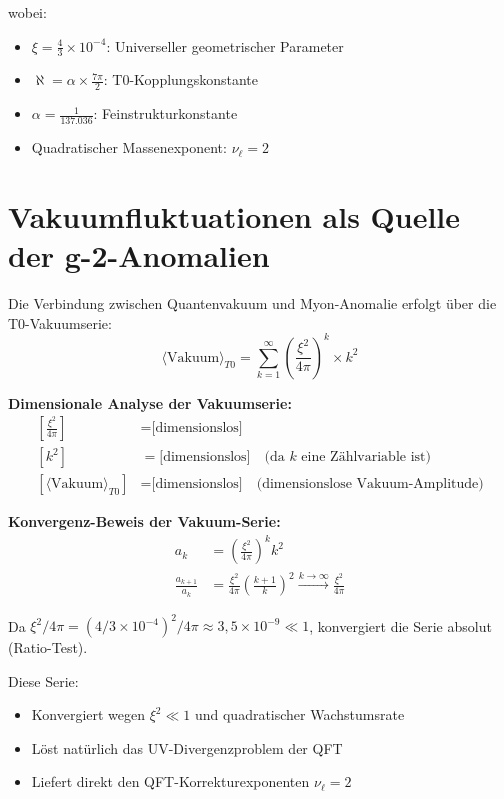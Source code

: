 \documentclass[12pt,a4paper]{article}
\begin{document}
	wobei:
	\begin{itemize}
		\item $\xi = \frac{4}{3} \times 10^{-4}$: Universeller geometrischer Parameter
		\item $\aleph = \alpha \times \frac{7\pi}{2}$: T0-Kopplungskonstante  
		\item $\alpha = \frac{1}{137.036}$: Feinstrukturkonstante
		\item Quadratischer Massenexponent: $\nu_\ell = 2$
	\end{itemize}
	
	\section{Vakuumfluktuationen als Quelle der g-2-Anomalien}
	
	Die Verbindung zwischen Quantenvakuum und Myon-Anomalie erfolgt über die T0-Vakuumserie:
	\begin{equation}
		\langle \text{Vakuum} \rangle_{T0} = \sum_{k=1}^{\infty} \left(\frac{\xi^2}{4\pi}\right)^k \times k^{2}
	\end{equation}
	
	\begin{units}
		\textbf{Dimensionale Analyse der Vakuumserie:}
		\begin{align}
			\left[\frac{\xi^2}{4\pi}\right] &= \text{[dimensionslos]} \\
			[k^{2}] &= \text{[dimensionslos]} \quad \text{(da } k \text{ eine Zählvariable ist)} \\
			[\langle \text{Vakuum} \rangle_{T0}] &= \text{[dimensionslos]} \quad \text{(dimensionslose Vakuum-Amplitude)}
		\end{align}
	\end{units}
	
	\textbf{Konvergenz-Beweis der Vakuum-Serie:}
	\begin{align}
		a_k &= \left(\frac{\xi^2}{4\pi}\right)^k k^{2} \\
		\frac{a_{k+1}}{a_k} &= \frac{\xi^2}{4\pi} \left(\frac{k+1}{k}\right)^{2} \xrightarrow{k \to \infty} \frac{\xi^2}{4\pi}
	\end{align}
	
	Da $\xi^2/4\pi = (4/3 \times 10^{-4})^2/4\pi \approx 3{,}5 \times 10^{-9} \ll 1$, konvergiert die Serie absolut (Ratio-Test).
	
	Diese Serie:
	\begin{itemize}
		\item Konvergiert wegen $\xi^2 \ll 1$ und quadratischer Wachstumsrate
		\item Löst natürlich das UV-Divergenzproblem der QFT
		\item Liefert direkt den QFT-Korrekturexponenten $\nu_\ell = 2$
	\end{itemize}
	
\end{document}
